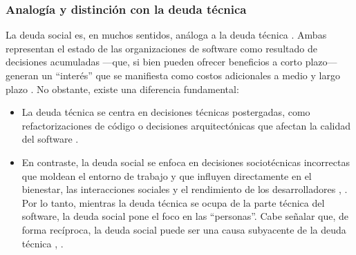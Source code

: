 \subsubsection{Analogía y distinción con la deuda técnica}
La deuda social es, en muchos sentidos, análoga a la deuda técnica \cite{tamburri2015insights}. Ambas representan el estado de las organizaciones de software como resultado de decisiones acumuladas —que, si bien pueden ofrecer beneficios a corto plazo— generan un ``interés'' que se manifiesta como costos adicionales a medio y largo plazo \cite{martini2019agiledebt}. No obstante, existe una diferencia fundamental:
\begin{itemize}
    \item La deuda técnica se centra en decisiones técnicas postergadas, como refactorizaciones de código o decisiones arquitectónicas que afectan la calidad del software \cite{caballero2022communitysmells}.
    \item En contraste, la deuda social se enfoca en decisiones sociotécnicas incorrectas que moldean el entorno de trabajo y que influyen directamente en el bienestar, las interacciones sociales y el rendimiento de los desarrolladores \cite{caballero2022communitysmells}, \cite{caballero2021thesis}. Por lo tanto, mientras la deuda técnica se ocupa de la parte técnica del software, la deuda social pone el foco en las ``personas''. Cabe señalar que, de forma recíproca, la deuda social puede ser una causa subyacente de la deuda técnica \cite{caballero2022communitysmells}, \cite{caballero2021thesis}.
\end{itemize}

